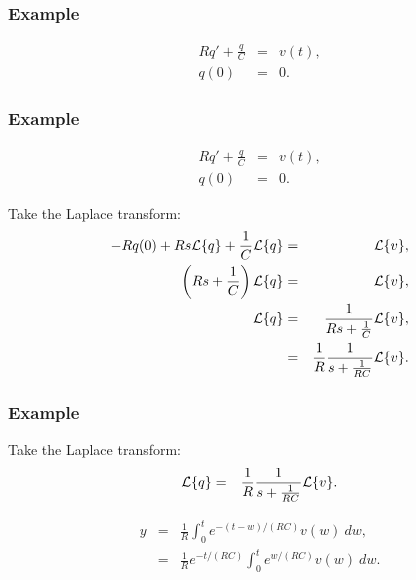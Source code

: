 \begin{frame}
  \frametitle{Example}

  

  {
    \begin{eqnarray*}
      R q' + \frac{q}{C} & = & v(t), \\
      q(0) & = & 0.
    \end{eqnarray*}
  }

\end{frame}

\begin{frame}
  \frametitle{Example}

    \begin{eqnarray*}
      R q' + \frac{q}{C} & = & v(t), \\
      q(0) & = & 0.
    \end{eqnarray*}

  {
    Take the Laplace transform:
    \begin{eqnarray*}
      -R q(0) + Rs\laplace{q} + \frac{1}{C} \laplace{q} & = & \laplace{v}, \\
      \lp Rs+\frac{1}{C} \rp \laplace{q}  & = & \laplace{v}, \\
      \laplace{q}  & = & \frac{1}{Rs+\frac{1}{C}} \laplace{v}, \\
      & = & \frac{1}{R} \frac{1}{s + \frac{1}{RC}} \laplace{v}.
    \end{eqnarray*}
  }


\end{frame}


\begin{frame}
  \frametitle{Example}


    Take the Laplace transform:
    \begin{eqnarray*}
      \laplace{q}  & = & \frac{1}{R} \frac{1}{s + \frac{1}{RC}} \laplace{v}.
    \end{eqnarray*}

  {

    \begin{eqnarray*}
      y & = & \frac{1}{R} \int^t_0 e^{-(t-w)/(RC)} v(w) ~ dw, \\
      & = & \frac{1}{R} e^{-t/(RC)} \int^t_0 e^{w/(RC)} v(w) ~ dw.
    \end{eqnarray*}

  }


\end{frame}




